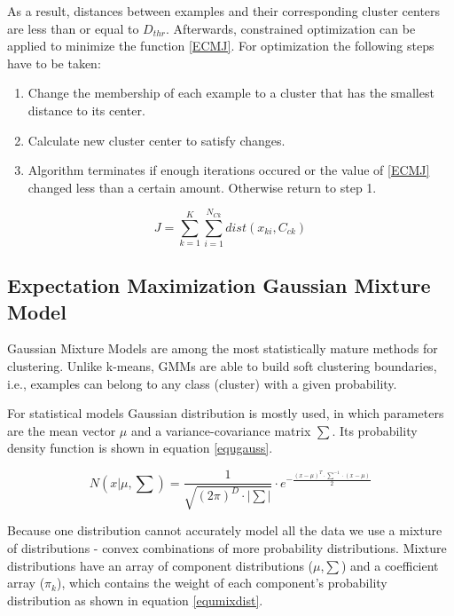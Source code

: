\documentclass[conference]{IEEEtran}
\begin{document}
As a result, distances between examples and their corresponding cluster centers are less than or equal to $D_{thr}$.
Afterwards, constrained optimization can be applied to minimize the function \ref{ECMJ}. For optimization the following steps have to be taken:
\begin{enumerate}
	\item Change the membership of each example to a cluster that has the smallest distance to its center.
	\item Calculate new cluster center to satisfy changes.
	\item Algorithm terminates if enough iterations occured or the value of \ref{ECMJ} changed less than a certain amount.
		Otherwise return to step 1.
\end{enumerate}

\begin{equation}\label{ECMJ}
	J = \sum_{k=1}^K \sum_{i=1}^{N_{Ck}} dist(x_{ki}, C_{ck})
\end{equation}


\subsection{Expectation Maximization Gaussian Mixture Model}

Gaussian Mixture Models are among the most statistically mature methods for clustering. Unlike k-means,
GMMs are able to build soft clustering boundaries, i.e., examples can belong to any class (cluster) with a given probability.

For statistical models Gaussian distribution is mostly used, in which parameters are the mean vector $\mu$ and a
variance-covariance matrix $\sum$. Its probability density function is shown in equation \ref{equgauss}.

\begin{equation}\label{equgauss}
	N(x|\mu,\sum) = \frac{1}{\sqrt{(2\pi)^D \cdot |\sum|}} \cdot e^{-\frac{(x-\mu)^T \cdot \sum^{-1} \cdot (x-\mu)}{2}}
\end{equation}

Because one distribution cannot accurately model all the data we use a mixture of distributions - convex
combinations of more probability distributions. Mixture distributions have an array of component distributions
($\mu$,$\sum$) and a coefficient array ($\pi_k$), which contains the weight of each component's probability distribution
as shown in equation \ref{equmixdist}.
\end{document}
